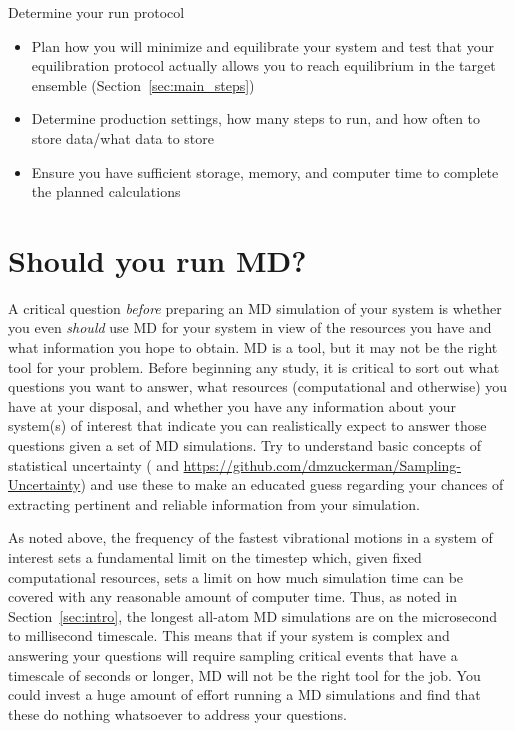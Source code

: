 \documentclass[9pt,bestpractices]{livecoms}
\begin{document}
\begin{Checklists*}[p!]
\begin{checklist}{Determine your run protocol}
\begin{itemize}
\item Plan how you will minimize and equilibrate your system and test that your equilibration protocol actually allows you to reach equilibrium in the target ensemble (Section~\ref{sec:main_steps})
\item Determine production settings, how many steps to run, and how often to store data/what data to store
\item Ensure you have sufficient storage, memory, and computer time to complete the planned calculations
\end{itemize}
\end{checklist}


\end{Checklists*}

\section{Should you run MD?}

A critical question \emph{before} preparing an MD simulation of your system is whether you even \emph{should} use MD for your system in view of the resources you have and what information you hope to obtain.
MD is a tool, but it may not be the right tool for your problem.
Before beginning any study, it is critical to sort out what questions you want to answer, what resources (computational and otherwise) you have at your disposal, and whether you have any information about your system(s) of interest that indicate you can realistically expect to answer those questions given a set of MD simulations.
Try to understand basic concepts of statistical uncertainty (\cite{Grossfield:2009:AnnuRepComputChem} and \url{https://github.com/dmzuckerman/Sampling-Uncertainty}) and use these to make an educated guess regarding your chances of extracting pertinent and reliable information from your simulation.

As noted above, the frequency of the fastest vibrational motions in a system of interest sets a fundamental limit on the timestep which, given fixed computational resources, sets a limit on how much simulation time can be covered with any reasonable amount of computer time.
Thus, as noted in Section~\ref{sec:intro}, the longest all-atom MD simulations are on the microsecond to millisecond timescale.
This means that if your system is complex and answering your questions will require sampling critical events that have a timescale of seconds or longer, MD will not be the right tool for the job.
You could invest a huge amount of effort running a MD simulations and find that these do nothing whatsoever to address your questions.
\end{document}
